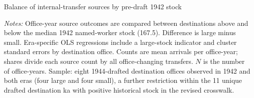 \documentclass{beamer}
\begin{document}
\begin{frame}[t]{Balance of internal-transfer sources by pre-draft 1942 stock}
\centering\scriptsize
{}
\vspace{0.5em}\raggedright
{\tiny \textit{Notes:} Office-year source outcomes are compared between destinations above and below the median 1942 named-worker stock (167.5). Difference is large minus small. Era-specific OLS regressions include a large-stock indicator and cluster standard errors by destination office. Counts are mean arrivals per office-year; shares divide each source count by all office-changing transfers. $N$ is the number of office-years. Sample: eight 1944-drafted destination offices observed in 1942 and both eras (four large and four small), a further restriction within the 11 unique drafted destination ka with positive historical stock in the revised crosswalk.}
\end{frame}
\end{document}

